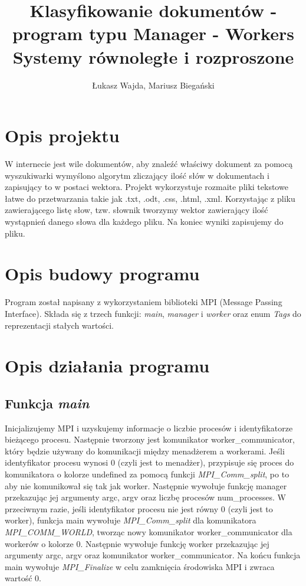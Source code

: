 \documentclass{article}
\title{Klasyfikowanie dokumentów - program typu Manager - Workers\large \\
Systemy równoległe i rozproszone}
\author{Łukasz Wajda, Mariusz Biegański}
\begin{document}
\maketitle

\section{Opis projektu}
W internecie jest wile dokumentów, aby znaleźć właściwy dokument za pomocą wyszukiwarki wymyślono algorytm zliczający ilość słów w dokumentach i zapisujący to w postaci wektora. Projekt wykorzystuje rozmaite pliki tekstowe łatwe do przetwarzania takie jak .txt, .odt, .css, .html, .xml. Korzystając z pliku zawierającego listę słow, tzw. słownik tworzymy wektor zawierający ilość wystąpnień danego słowa dla każdego pliku. Na koniec wyniki zapisujemy do pliku.

\section{Opis budowy programu}
Program został napisany z wykorzystaniem biblioteki MPI (Message Passing Interface). Składa się z trzech funkcji: \textit{main}, \textit{manager} i \textit{worker} oraz enum \textit{Tags} do reprezentacji stałych wartości.

\section{Opis działania programu}
\subsection{Funkcja \textit{main}}
Inicjalizujemy MPI i uzyskujemy informacje o liczbie procesów i identyfikatorze bieżącego procesu. Następnie tworzony jest komunikator worker\_communicator, który będzie używany do komunikacji między menadżerem a workerami. Jeśli identyfikator procesu wynosi 0 (czyli jest to menadżer), przypisuje się proces do komunikatora o kolorze undefined za pomocą funkcji \textit{MPI\_Comm\_split}, po to aby nie komunikował się tak jak worker. Następnie wywołuje funkcję manager przekazując jej argumenty argc, argv oraz liczbę procesów num\_processes. W przeciwnym razie, jeśli identyfikator procesu nie jest równy 0 (czyli jest to worker), funkcja main wywołuje \textit{MPI\_Comm\_split} dla komunikatora \textit{MPI\_COMM\_WORLD}, tworząc nowy komunikator worker\_communicator dla workerów o kolorze 0. Następnie wywołuje funkcję worker przekazując jej argumenty argc, argv oraz komunikator worker\_communicator. Na końcu funkcja main wywołuje \textit{MPI\_Finalize} w celu zamknięcia środowiska MPI i zwraca wartość 0.
\end{document}
